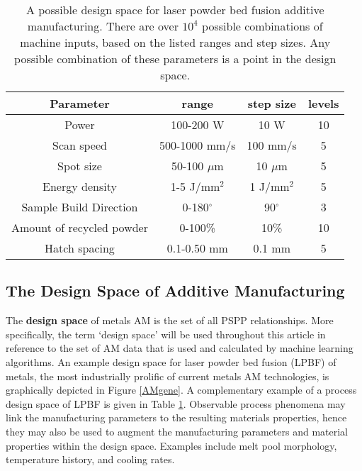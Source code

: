 
    \renewcommand{\arraystretch}{0.8}

    \setlength{\tabcolsep}{5pt}
\begin{table}
\begin{center}
 \caption{A possible design space for laser powder bed fusion additive manufacturing. There are over $10^4$ possible combinations of machine inputs, based on the listed ranges and step sizes. Any possible combination of these parameters is a point in the design space.}
         \label{table:design_space}        
         \begin{tabular}{c|c|c|c}       
            \toprule
            \hline
             Parameter & range & step size & levels \\ \midrule
            \hline
            Power & 100-200 W & 10 W & 10 \\
            Scan speed & 500-1000 mm/s & 100 mm/s & 5 \\
            Spot size & 50-100 $\mu$m & 10 $\mu$m & 5 \\
            Energy density & 1-5 J/mm$^2$ & 1 J/mm$^2$ & 5 \\
            Sample Build Direction & 0-180$^\circ$ & 90$^\circ$  & 3 \\
            Amount of recycled powder & 0-100\% & 10\% & 10 \\
            Hatch spacing & 0.1-0.50 mm & 0.1 mm  & 5 \\
            \hline
            \bottomrule
        \end{tabular}
\end{center}
\end{table}
 
 
\subsection{The Design Space of Additive Manufacturing}
The \textbf{design space} of metals AM is the set of all PSPP relationships. More specifically, the term `design space' will be used throughout this article in reference to the set of AM data that is used and calculated by machine learning algorithms. An example design space for laser powder bed fusion (LPBF) of metals, the most industrially prolific of current metals AM technologies, is graphically depicted in Figure \ref{AMgene}. A complementary example of a process design space of LPBF is given in Table \ref{table:design_space}. Observable process phenomena may link the manufacturing parameters to the resulting materials properties, hence they may also be used to augment the manufacturing parameters and material properties within the design space. Examples include melt pool morphology, temperature history, and cooling rates.

